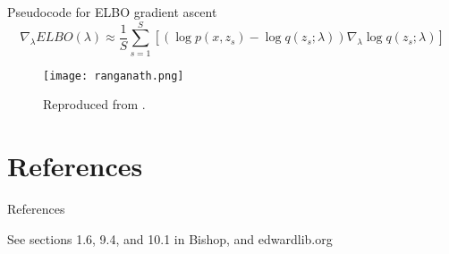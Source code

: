 \documentclass{beamer}
\begin{document}
\begin{frame}{Pseudocode for ELBO gradient ascent}
  \[\nabla_\lambda ELBO(\lambda) \approx \frac{1}{S} \sum_{s=1}^{S} \left[ \left( \log p(x, z_s) - \log q(z_s; \lambda)\right) \nabla_\lambda \log q(z_s; \lambda) \right]\]
  \begin{figure}
    \texttt{[image: ranganath.png]}
    \caption{Reproduced from \cite{ranganath2014}.}
  \end{figure}
\end{frame}

    
\section{References}
\begin{frame}{References}
  \begin{block}{See sections 1.6, 9.4, and 10.1 in Bishop, and edwardlib.org}
    \AtNextBibliography{\small}
    \printbibliography
  \end{block}
\end{frame}

\end{document}
